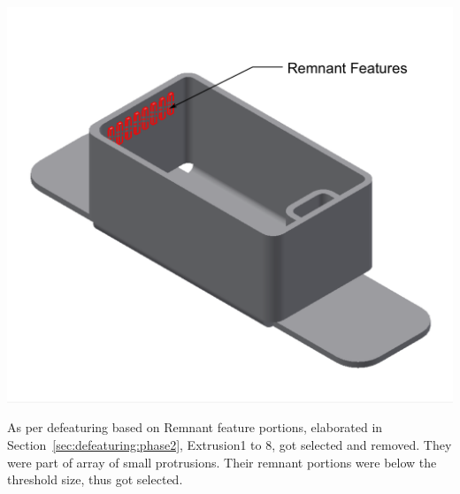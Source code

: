 



\begin{minipage}{\linewidth}
\begin{minipage}[c]{0.62\linewidth}
\includegraphics[width=\linewidth,valign=t]{../Common/images/SheetMetal_Medium_Enclosure_PhaseIISelections_3}
 \label{fig:results:phII}


As per defeaturing based on Remnant feature portions, elaborated in Section~\ref{sec:defeaturing:phase2}, Extrusion1 to 8,  got selected and removed. They were part of array of small protrusions. Their remnant portions were below the threshold size, thus got selected. %


\end{minipage}
\end{minipage}
